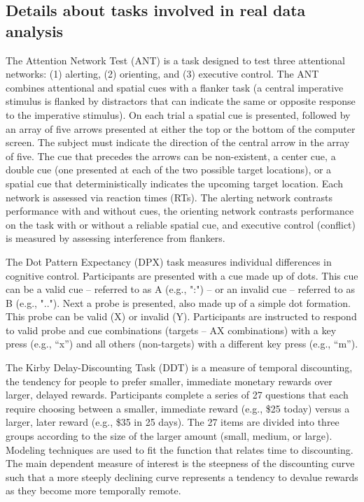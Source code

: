 \documentclass[titlepage,12pt] {article}
\begin{document}
\newpage

\subsection*{Details about tasks involved in real data analysis}


The Attention Network Test (ANT) is a task designed to test three attentional networks: (1) alerting, (2) orienting, and (3) executive control. The ANT combines attentional and spatial cues with a flanker task (a central imperative stimulus is flanked by distractors that can indicate the same or opposite response to the imperative stimulus). On each trial a spatial cue is presented, followed by an array of five arrows presented at either the top or the bottom of the computer screen. The subject must indicate the direction of the central arrow in the array of five. The cue that precedes the arrows can be non-existent, a center cue, a double cue (one presented at each of the two possible target locations), or a spatial cue that deterministically indicates the upcoming target location. Each network is assessed via reaction times (RTs). The alerting network contrasts performance with and without cues, the orienting network contrasts performance on the task with or without a reliable spatial cue, and executive control (conflict) is measured by assessing interference from flankers.

The Dot Pattern Expectancy (DPX) task measures individual differences in cognitive control. Participants are presented with a cue made up of dots. This cue can be a valid cue – referred to as A (e.g., ":") – or an invalid cue – referred to as B (e.g., ".."). Next a probe is presented, also made up of a simple dot formation. This probe can be valid (X) or invalid (Y). Participants are instructed to respond to valid probe and cue combinations (targets – AX combinations) with a key press (e.g., “x”) and all others (non-targets) with a different key press (e.g., “m”).

The Kirby Delay-Discounting Task (DDT) is a measure of temporal discounting, the tendency for people to prefer smaller, immediate monetary rewards over larger, delayed rewards. Participants complete a series of 27 questions that each require choosing between a smaller, immediate reward (e.g., \$25 today) versus a larger, later reward (e.g., \$35 in 25 days). The 27 items are divided into three groups according to the size of the larger amount (small, medium, or large). Modeling techniques are used to fit the function that relates time to discounting. The main dependent measure of interest is the steepness of the discounting curve such that a more steeply declining curve represents a tendency to devalue rewards as they become more temporally remote.
\end{document}
